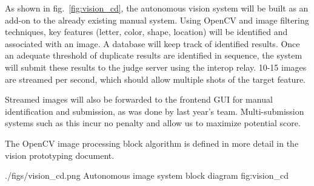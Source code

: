 As shown in fig.~\ref{fig:vision_cd}, the autonomous vision system will be built as an add-on to the already existing manual system. Using OpenCV and image filtering techniques, key features (letter, color, shape, location) will be identified and associated with an image. A database will keep track of identified results. Once an adequate threshold of duplicate results are identified in sequence, the system will submit these results to the judge server using the interop relay. 10-15 images are streamed per second, which should allow multiple shots of the target feature.

Streamed images will also be forwarded to the frontend GUI for manual identification and submission, as was done by last year’s team. Multi-submission systems such as this incur no penalty and allow us to maximize potential score.

The OpenCV image processing block algorithm is defined in more detail in the vision prototyping document.

\AUVSIFigure
{./figs/vision_cd.png}
{\textwidth}
{Autonomous image system block diagram}
{fig:vision_cd}
